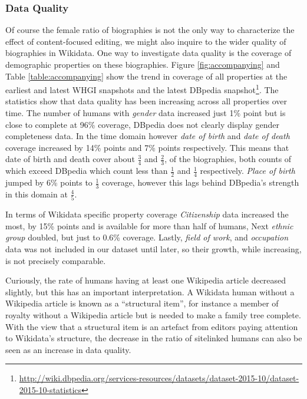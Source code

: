\documentclass{sig-alternate-05-2015}
\begin{document}
\subsubsection{Data Quality}
Of course the female ratio of biographies is not the only way to characterize the effect of content-focused editing, we might also inquire to the wider quality of biographies in Wikidata. One way to investigate data quality is the coverage of demographic  properties on these biographies. Figure \ref{fig:accompanying} and Table \ref{table:accompanying} show the trend in coverage of all properties at the earliest and latest WHGI snapshots and the latest DBpedia snapshot\footnote{\url{http://wiki.dbpedia.org/services-resources/datasets/dataset-2015-10/dataset-2015-10-statistics}}. The statistics show that data quality has been increasing across all properties over time. The number of humans with \textit{gender} data increased just 1\% point but is close to complete at 96\% coverage, DBpedia does not clearly display gender completeness data. In the time domain however \textit{date of birth} and \textit{date of death} coverage increased by 14\% points and 7\% points respectively. This means that date of birth and death cover about $\frac{3}{4}$ and $\frac{2}{3}$, of the biographies, both counts of which exceed DBpedia which count less than $\frac{1}{2}$ and $\frac{1}{4}$ respectively. \textit{Place of birth} jumped by 6\% points to $\frac{1}{3}$ coverage, however this lags behind DBpedia's strength in this domain at $\frac{4}{5}$.

In terms of Wikidata specific property coverage \textit{Citizenship} data increased the most, by 15\% points and is available for more than half of humans, Next \textit{ethnic group} doubled, but just to 0.6\% coverage. Lastly, \textit{field of work}, and \textit{occupation} data was not included in our dataset until later, so their growth, while increasing, is not precisely comparable.


Curiously, the rate of humans having at least one Wikipedia article decreased slightly, but this has an important interpretation. A Wikidata human without a Wikipedia article is known as a ``structural item'', for instance a member of royalty without a Wikipedia article but is needed to make a family tree complete. With the view that a structural item is an artefact from editors paying attention to Wikidata's structure, the decrease in the ratio of sitelinked humans can also be seen as an increase in data quality. 
\end{document}
